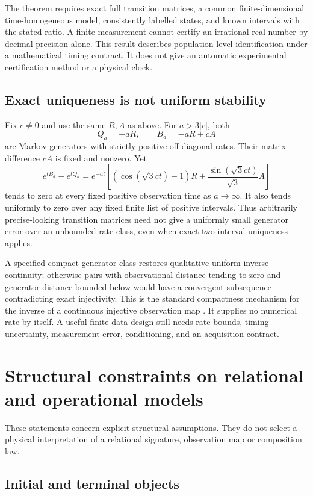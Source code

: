 \documentclass[11pt,letterpaper]{article}
\begin{document}
The theorem requires exact full transition matrices, a common finite-dimensional time-homogeneous model, consistently labelled states, and known intervals with the stated ratio. A finite measurement cannot certify an irrational real number by decimal precision alone. This result describes population-level identification under a mathematical timing contract. It does not give an automatic experimental certification method or a physical clock.

\subsection{Exact uniqueness is not uniform stability}

Fix $c\ne0$ and use the same $R,A$ as above. For $a>3|c|$, both
\[
 Q_a=-aR,\qquad B_a=-aR+cA
\]
are Markov generators with strictly positive off-diagonal rates. Their matrix difference $cA$ is fixed and nonzero. Yet
\[
 e^{tB_a}-e^{tQ_a}
 =e^{-at}\left[(\cos(\sqrt3ct)-1)R+
 \frac{\sin(\sqrt3ct)}{\sqrt3}A\right]
\]
tends to zero at every fixed positive observation time as $a\to\infty$. It also tends uniformly to zero over any fixed finite list of positive intervals. Thus arbitrarily precise-looking transition matrices need not give a uniformly small generator error over an unbounded rate class, even when exact two-interval uniqueness applies.

A specified compact generator class restores qualitative uniform inverse continuity: otherwise pairs with observational distance tending to zero and generator distance bounded below would have a convergent subsequence contradicting exact injectivity. This is the standard compactness mechanism for the inverse of a continuous injective observation map \cite{internalcollection}. It supplies no numerical rate by itself. A useful finite-data design still needs rate bounds, timing uncertainty, measurement error, conditioning, and an acquisition contract.


\section{Structural constraints on relational and operational models}

These statements concern explicit structural assumptions. They do not select
a physical interpretation of a relational signature, observation map or
composition law.

\subsection{Initial and terminal objects}
\end{document}
